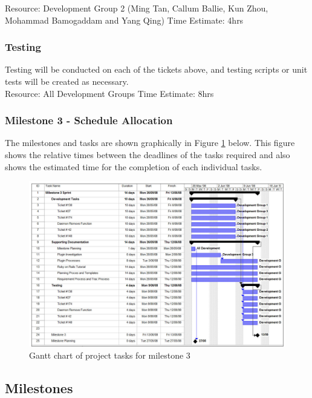 \documentclass{article}
\begin{document}
	Resource: Development Group 2 (Ming Tan, Callum Ballie, Kun Zhou, Mohammad Bamogaddam and Yang Qing)
	Time Estimate: 4hrs

\subsubsection{Testing}
	Testing will be conducted on each of the tickets above, and testing scripts or unit tests will be created as necessary.\\
	
	Resource: All Development Groups
	Time Estimate: 8hrs

\subsubsection{Milestone 3 - Schedule Allocation}

The milestones and tasks are shown graphically in Figure \ref{fig:schedule3} below. This figure shows the relative times between the deadlines of the tasks required and also shows the estimated time for the completion of each individual tasks.\\

\begin{figure}[htp]
\begin{centering}
\includegraphics[angle=90,scale=0.5]{./schedule-milestone3.jpg} 
\par\end{centering}
\caption{Gantt chart of project tasks for milestone 3}
\label{fig:schedule3} 
\end{figure}

\newpage{}

\subsection{Milestones}
\end{document}
